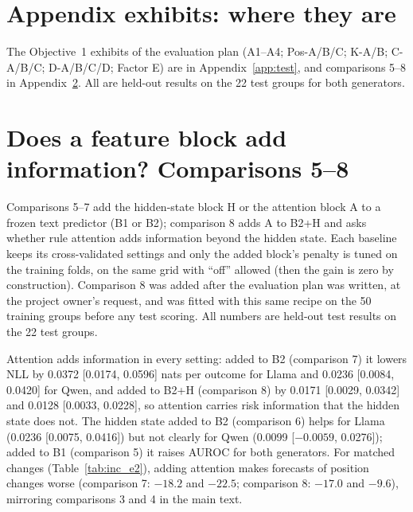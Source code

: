 \documentclass{article}
\begin{document}
\section{Appendix exhibits: where they are}
\label{app:planned}

The Objective~1 exhibits of the evaluation plan (A1--A4; Pos-A/B/C; K-A/B; C-A/B/C; D-A/B/C/D; Factor E) are in
Appendix~\ref{app:test}, and comparisons 5--8 in Appendix~\ref{app:incremental}. All are held-out results on the 22 test
groups for both generators.

\section{Does a feature block add information? Comparisons 5--8}
\label{app:incremental}
Comparisons 5--7 add the hidden-state block H or the attention block A to a frozen text predictor (B1 or B2); comparison 8 adds A to B2+H and asks whether rule attention adds information beyond the hidden state. Each baseline keeps its cross-validated settings and only the added block's penalty is tuned on the training folds, on the same grid with ``off'' allowed (then the gain is zero by construction). Comparison 8 was added after the evaluation plan was written, at the project owner's request, and was fitted with this same recipe on the 50 training groups before any test scoring. All numbers are held-out test results on the 22 test groups.

Attention adds information in every setting: added to B2 (comparison 7) it lowers NLL by 0.0372 [0.0174, 0.0596] nats per outcome for Llama and 0.0236 [0.0084, 0.0420] for Qwen, and added to B2+H (comparison 8) by 0.0171 [0.0029, 0.0342] and 0.0128 [0.0033, 0.0228], so attention carries risk information that the hidden state does not. The hidden state added to B2 (comparison 6) helps for Llama (0.0236 [0.0075, 0.0416]) but not clearly for Qwen (0.0099 [$-0.0059$, 0.0276]); added to B1 (comparison 5) it raises AUROC for both generators. For matched changes (Table~\ref{tab:inc_e2}), adding attention makes forecasts of position changes worse (comparison 7: $-18.2$ and $-22.5$; comparison 8: $-17.0$ and $-9.6$), mirroring comparisons 3 and 4 in the main text.
\end{document}
